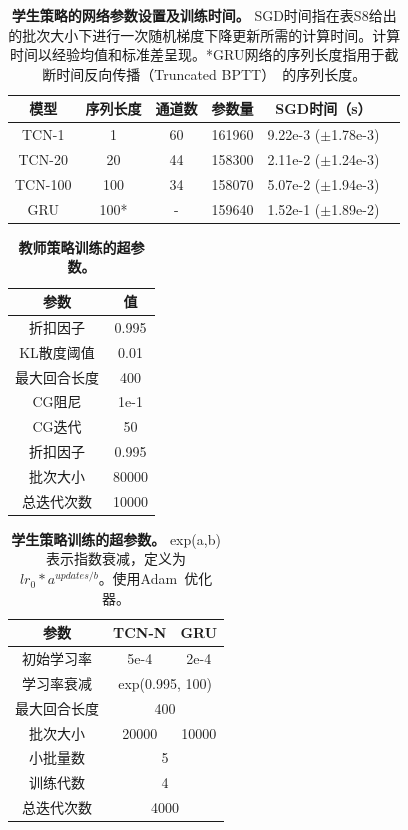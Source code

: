 \documentclass[9pt,twocolumn,twoside]{osajnl}
\begin{document}
\begin{table}
\centering
 \begin{tabular}{|c|c|c|c|c|c|}
\hline
 模型 & 序列长度 & 通道数 & 参数量 & SGD时间（s） \\ \hline
TCN-1  & 1 & 60 & 161960 & 9.22e-3 ($\pm$1.78e-3)\\ \hline
 TCN-20 & 20 & 44 & 158300 & 2.11e-2 ($\pm$1.24e-3)\\ \hline
 TCN-100 & 100 & 34 & 158070& 5.07e-2 ($\pm$1.94e-3)\\ \hline
 GRU & 100* & - & 159640 & 1.52e-1 ($\pm$1.89e-2) \\ \hline
\end{tabular}
\caption{\textbf{学生策略的网络参数设置及训练时间。} SGD时间指在表S8给出的批次大小下进行一次随机梯度下降更新所需的计算时间。计算时间以经验均值和标准差呈现。*GRU网络的序列长度指用于截断时间反向传播（Truncated BPTT）~\cite{williams1990efficient}的序列长度。} \label{tab:netarchitectures2}
\end{table}

\begin{table}
\centering
 \begin{tabular}{|c|c|}
\hline
 参数 & 值  \\ \hline
 折扣因子 & 0.995 \\ \hline
 KL散度阈值 & 0.01  \\ \hline
 最大回合长度 & 400 \\ \hline
 CG阻尼 & 1e-1 \\ \hline
 CG迭代 & 50 \\ \hline
 折扣因子 & 0.995 \\ \hline
批次大小 & 80000 \\ \hline
总迭代次数 & 10000 \\ \hline
\end{tabular}
\caption{\textbf{教师策略训练的超参数。}}
\label{tab:hyperparametersteacher}
\end{table}

\begin{table}
\centering
 \begin{tabular}{|c|c|c|}
\hline
 参数 & TCN-N & GRU  \\ \hline
初始学习率 & 5e-4 & 2e-4 \\ \hline
学习率衰减 & \multicolumn{2}{|c|}{exp(0.995, 100)} \\ \hline
 最大回合长度 &\multicolumn{2}{|c|}{400} \\ \hline
 批次大小 & 20000& 10000 \\ \hline
 小批量数 & \multicolumn{2}{|c|}{5} \\ \hline
 训练代数 &\multicolumn{2}{|c|}{4}\\ \hline
 总迭代次数 &\multicolumn{2}{|c|}{4000}\\ \hline
\end{tabular}
\caption{\textbf{学生策略训练的超参数。} exp(a,b)表示指数衰减，定义为$lr_0 * a^{updates/b}$。使用Adam~\cite{kingma2014adam}优化器。}
 \label{tab:hyperparameterslearner}
\end{table}
\end{document}
